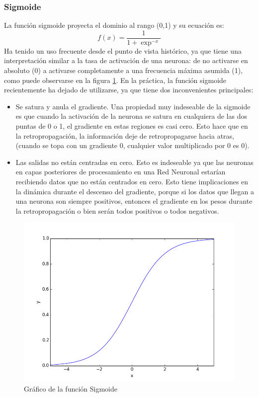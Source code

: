 \documentclass[a4paper,11pt,spanish]{book}
\begin{document}
	  \subsubsection {Sigmoide}

	    La función sigmoide proyecta el dominio al rango (0,1) y su ecuación es:
	    \begin{equation*}
	     f(x) = \frac{1}{1+\exp^{-x}}
	    \end{equation*}
	    Ha tenido un uso frecuente desde el punto de vista histórico, ya que tiene una interpretación similar a la tasa de activación de una neurona:
	    de no activarse en absoluto (0) a activarse completamente a una frecuencia máxima asumida (1), como puede observarse en la figura \ref{fig:sigmoid}. En la práctica, la función sigmoide recientemente ha dejado de utilizarse,
	    ya  que tiene dos inconvenientes principales:
	    \begin{itemize}
	     \item Se satura y anula el gradiente. Una propiedad muy indeseable de la sigmoide es que cuando la activación de la neurona se satura en cualquiera de las dos puntas de 0 o 1,
	      el gradiente en estas regiones es casi cero. Esto hace que en la retropropagación, la información deje de retropropagarse hacia atras, (cuando se topa con un gradiente 0, cualquier
	      valor multiplicado por 0 es 0).
	     \item Las salidas no están centradas en cero. Esto es indeseable ya que las neuronas en capas posteriores de procesamiento en una Red Neuronal estarían recibiendo
	      datos que no están centrados en cero. Esto tiene implicaciones en la dinámica durante el descenso del gradiente, porque si los datos que llegan a una neurona
	      son siempre positivos, entonces el gradiente en los pesos durante la retropropagación o bien serán todos positivos o todos negativos.
	    \end{itemize}
	    \begin{figure}[ht]
	      \begin{center}
	       \includegraphics[width=0.4\linewidth]{./img/sigmoid.png}
	      \end{center}
	      \caption{Gráfico de la función Sigmoide}
	      \label{fig:sigmoid}
	    \end{figure}
\end{document}
